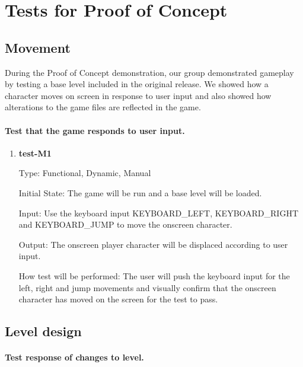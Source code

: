 \documentclass[12pt, titlepage]{article}
\begin{document}
\section{Tests for Proof of Concept}

\subsection{Movement}

During the Proof of Concept demonstration, our group demonstrated gameplay by testing a base level included in the original release. We showed how a character moves on screen in response to user input and also showed how alterations to the game files are reflected in the game.

\paragraph{Test that the game responds to user input.}

\begin{enumerate}

\item{\textbf{test-M1\\}}

Type: Functional, Dynamic, Manual

Initial State: The game will be run and a base level will be loaded.

Input: Use the keyboard input KEYBOARD\_LEFT, KEYBOARD\_RIGHT and KEYBOARD\_JUMP         to move the onscreen character.

Output: The onscreen player character will be displaced according to user input.

How test will be performed: The user will push the keyboard input for the left, right and jump movements and visually confirm that the onscreen character has moved on the screen for the test to pass.

\end{enumerate}

\subsection{Level design}

\paragraph{Test response of changes to level.}
\end{document}
